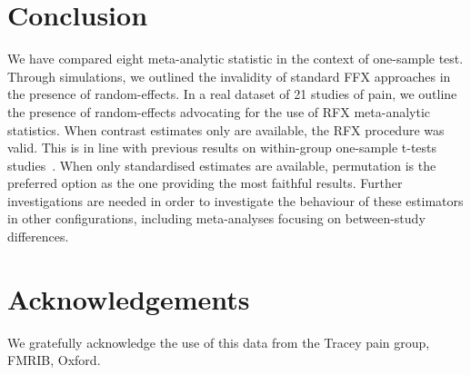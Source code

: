 \documentclass{llncs}
\begin{document}
\section{Conclusion}
We have compared eight meta-analytic statistic in the context of one-sample test. Through simulations, we outlined the invalidity of standard FFX approaches in the presence of random-effects. In a real dataset of 21 studies of pain, we outline the presence of random-effects advocating for the use of RFX meta-analytic statistics. When contrast estimates only are available, the RFX procedure was valid. This is in line with previous results on within-group one-sample t-tests studies~\cite{Mumford2009}. When only standardised estimates are available, permutation is the preferred option as the one providing the most faithful results. Further investigations are needed in order to investigate the behaviour of these estimators in other configurations, including meta-analyses focusing on between-study differences.


\section{Acknowledgements}
We gratefully acknowledge the use of this data from the Tracey pain group, FMRIB, Oxford.

%








\end{document}
